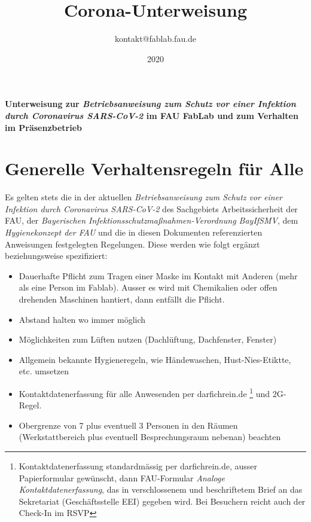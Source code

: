 \documentclass[13pt]{\basedir/fablab-document}
\date{2020}
\author{kontakt@fablab.fau.de}
\title{Corona-Unterweisung}
\begin{document}
\maketitle

\begin{center}
  \textbf{Unterweisung zur \emph{Betriebsanweisung zum Schutz vor einer Infektion durch Coronavirus SARS-CoV-2} im FAU FabLab und zum Verhalten im Präsenzbetrieb}
\end{center}

\vbox{\vspace{1cm}}


\section{Generelle Verhaltensregeln für Alle}
Es gelten stets die in der aktuellen 
\emph{Betriebsanweisung zum Schutz vor einer Infektion durch Coronavirus SARS-CoV-2} des Sachgebiets Arbeitssicherheit der FAU, 
der \emph{Bayerischen Infektionsschutzmaßnahmen-Verordnung BayIfSMV}, 
dem \emph{Hygienekonzept der FAU} und 
die in diesen Dokumenten referenzierten Anweisungen 
festgelegten Regelungen. Diese werden wie folgt ergänzt beziehungsweise spezifiziert: 

\begin{itemize}
  \item  Dauerhafte Pflicht zum Tragen einer Maske im Kontakt mit Anderen (mehr als eine Person im Fablab). Ausser es wird mit Chemikalien oder offen drehenden Maschinen hantiert, dann entfällt die Pflicht.
  \item  Abstand halten wo immer möglich
  \item  Möglichkeiten zum Lüften nutzen (Dachlüftung, Dachfenster, Fenster)
  \item  Allgemein bekannte Hygieneregeln, wie Händewaschen, Hust-Nies-Etiktte, etc. umsetzen
  \item  Kontaktdatenerfassung für alle Anwesenden per darfichrein.de \footnote{Kontaktdatenerfassung standardmässig per darfichrein.de, ausser Papierformular gewünscht, dann FAU-Formular \emph{Analoge Kontaktdatenerfassung}, das in verschlossenem und beschriftetem Brief an das Sekretariat (Geschäftsstelle EEI) gegeben wird. Bei Besuchern reicht auch der Check-In im RSVP} und 2G-Regel. 
  \item  Obergrenze von 7 plus eventuell 3 Personen in den Räumen (Werkstattbereich plus eventuell Besprechungsraum nebenan) beachten
\end{itemize}
\end{document}
